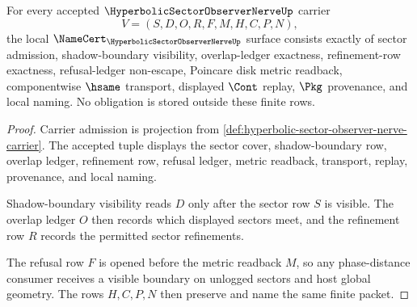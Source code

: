 \begin{theorem}
\label{thm:hyperbolic-sector-observer-nerve-namecert-obligations}
For every accepted $\HyperbolicSectorObserverNerveUp$ carrier
$$
V=(S,D,O,R,F,M,H,C,P,N),
$$
the local $\NameCert_{\HyperbolicSectorObserverNerveUp}$ surface consists exactly of sector admission, shadow-boundary visibility, overlap-ledger exactness, refinement-row exactness, refusal-ledger non-escape, Poincare disk metric readback, componentwise $\hsame$ transport, displayed $\Cont$ replay, $\Pkg$ provenance, and local naming. No obligation is stored outside these finite rows.
\end{theorem}
\begin{proof}
Carrier admission is projection from \autoref{def:hyperbolic-sector-observer-nerve-carrier}. The accepted tuple displays the sector cover, shadow-boundary row, overlap ledger, refinement row, refusal ledger, metric readback, transport, replay, provenance, and local naming.

Shadow-boundary visibility reads $D$ only after the sector row $S$ is visible. The overlap ledger $O$ then records which displayed sectors meet, and the refinement row $R$ records the permitted sector refinements.

The refusal row $F$ is opened before the metric readback $M$, so any phase-distance consumer receives a visible boundary on unlogged sectors and host global geometry. The rows $H,C,P,N$ then preserve and name the same finite packet.
\end{proof}

